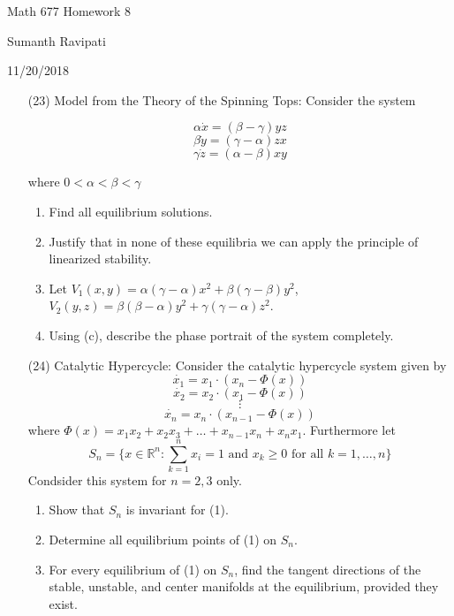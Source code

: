 \documentclass[12pt,letterpaper,reqno]{amsart}
\newcommand{\R}{\mathbb R}
\begin{document}
\thispagestyle{empty}
\centerline{\Large Math 677 Homework 8}
\centerline{Sumanth Ravipati}
\centerline{11/20/2018}
\vspace{.25in}

\begin{enumerate}
\item[(23)] Model from the Theory of the Spinning Tops: Consider the system

$$\alpha \dot{x} = (\beta - \gamma)yz$$
$$\beta \dot{y} = (\gamma - \alpha)zx$$
$$\gamma \dot{z} = (\alpha - \beta)xy$$

where $0 < \alpha < \beta < \gamma$

\begin{enumerate}
    \item Find all equilibrium solutions.
    \item Justify that in none of these equilibria we can apply the principle of linearized stability.
    \item Let $V_1(x,y) = \alpha(\gamma - \alpha)x^2 + \beta(\gamma - \beta)y^2$, $V_2(y,z) = \beta(\beta - \alpha)y^2 + \gamma(\gamma - \alpha)z^2$.
    \item Using (c), describe the phase portrait of the system completely.
\end{enumerate}

\item[(24)] Catalytic Hypercycle: Consider the catalytic hypercycle system given by
$$\dot{x_1} = x_1 \cdot (x_n - \Phi(x))$$
$$\dot{x_2} = x_2 \cdot (x_1 - \Phi(x))$$
$$\vdots$$
$$\dot{x_n} = x_n \cdot (x_{n-1} - \Phi(x))$$
where $\Phi(x) = x_1x_2 + x_2x_3 + \ldots + x_{n-1}x_n + x_nx_1$. Furthermore let
$$S_n = \{x \in \R^n : \sum\limits_{k=1}^n x_i = 1 \text{ and } x_k \geq 0 \text{ for all } k = 1, \ldots, n\}$$
Condsider this system for $n=2, 3$ only.
\begin{enumerate}
    \item Show that $S_n$ is invariant for (1).
    \item Determine all equilibrium points of (1) on $S_n$.
    \item For every equilibrium of (1) on $S_n$, find the tangent directions of the stable, unstable, and center manifolds at the equilibrium, provided they exist.
\end{enumerate}
\end{enumerate}
\end{document}
